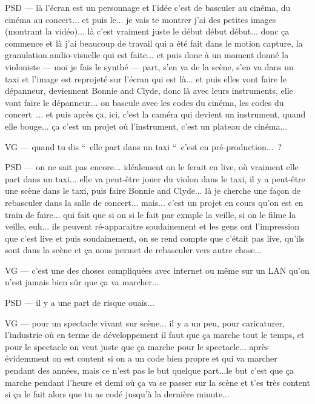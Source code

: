 PSD — là l'écran est un personnage et l'idée c'est de basculer au cinéma, du cinéma au concert... et puis le... je vais te montrer j'ai des petites images (montrant la vidéo)... là c'est vraiment juste le début début début... donc ça commence et là j'ai beaucoup de travail qui a été fait dans le motion capture, la granulation audio-visuelle qui est faite... et puis donc à un moment donné la violoniste — moi je fais le synthé — part, s'en va de la scène, s'en va dans un taxi et l'image est reprojeté sur l'écran qui est là... et puis elles vont faire le dépanneur, deviennent Bonnie and Clyde, donc là avec leurs instruments, elle vont faire le dépanneur... on bascule avec les codes du cinéma, les codes du concert ... et puis après ça, ici, c'est la caméra qui devient un instrument, quand elle bouge... ça c'est un projet où l'instrument, c'est un plateau de cinéma...

VG — quand tu dis “ elle part dans un taxi “ c'est en pré-production... ?

PSD — on ne sait pas encore... idéalement on le ferait en live, où vraiment elle part dans un taxi... elle va peut-être jouer du violon dans le taxi, il y a peut-être une scène dans le taxi, puis faire Bonnie and Clyde... là je cherche une façon de rebasculer dans la salle de concert... mais... c'est un projet en cours qu'on est en train de faire... qui fait que si on si le fait par exmple la veille, si on le filme la veille, euh... ils peuvent ré-apparaitre soudainement et les gens ont l'impression que c'est live et puis soudainement, on se rend compte que c'était pas live, qu'ils sont dans la scène et ça nous permet de rebasculer vers autre chose...

VG — c'est une des choses compliquées avec internet ou même sur un LAN qu'on n'est jamais bien sûr que ça va marcher...

PSD — il y a une part de risque ouais... 

VG —  pour un spectacle vivant sur scène... il y a un peu, pour caricaturer, l'industrie où en terme de développement il faut que ça marche tout le temps, et pour le spectacle on veut juste que ça marche pour le spectacle... après évidemment on est content si on a un code bien propre et qui va marcher pendant des années, mais ce n'est pas le but quelque part...le but c'est que ça marche pendant l'heure et demi où ça va se passer sur la scène et t'es très content si ça le fait alors que tu as codé jusqu'à la dernière minute...

